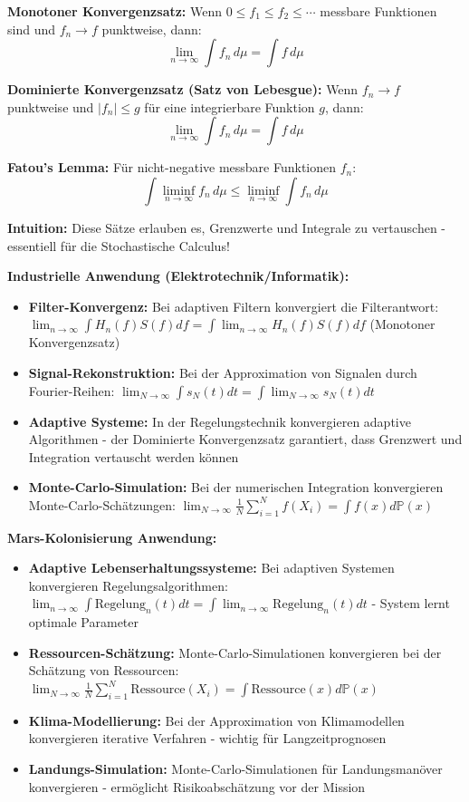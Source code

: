 \begin{denoobification}
\textbf{Monotoner Konvergenzsatz:}
Wenn $0 \leq f_1 \leq f_2 \leq \cdots$ messbare Funktionen sind und $f_n \to f$ punktweise, dann:
\[
\lim_{n \to \infty} \int f_n \, d\mu = \int f \, d\mu
\]

\textbf{Dominierte Konvergenzsatz (Satz von Lebesgue):}
Wenn $f_n \to f$ punktweise und $|f_n| \leq g$ für eine integrierbare Funktion $g$, dann:
\[
\lim_{n \to \infty} \int f_n \, d\mu = \int f \, d\mu
\]

\textbf{Fatou's Lemma:}
Für nicht-negative messbare Funktionen $f_n$:
\[
\int \liminf_{n \to \infty} f_n \, d\mu \leq \liminf_{n \to \infty} \int f_n \, d\mu
\]

\textbf{Intuition:} Diese Sätze erlauben es, Grenzwerte und Integrale zu vertauschen - essentiell für die Stochastische Calculus!

\textbf{Industrielle Anwendung (Elektrotechnik/Informatik):}
\begin{itemize}
    \item \textbf{Filter-Konvergenz:} Bei adaptiven Filtern konvergiert die Filterantwort: $\lim_{n \to \infty} \int H_n(f) S(f) df = \int \lim_{n \to \infty} H_n(f) S(f) df$ (Monotoner Konvergenzsatz)
    \item \textbf{Signal-Rekonstruktion:} Bei der Approximation von Signalen durch Fourier-Reihen: $\lim_{N \to \infty} \int s_N(t) dt = \int \lim_{N \to \infty} s_N(t) dt$
    \item \textbf{Adaptive Systeme:} In der Regelungstechnik konvergieren adaptive Algorithmen - der Dominierte Konvergenzsatz garantiert, dass Grenzwert und Integration vertauscht werden können
    \item \textbf{Monte-Carlo-Simulation:} Bei der numerischen Integration konvergieren Monte-Carlo-Schätzungen: $\lim_{N \to \infty} \frac{1}{N}\sum_{i=1}^N f(X_i) = \int f(x) d\mathbb{P}(x)$
\end{itemize}

\textbf{Mars-Kolonisierung Anwendung:}
\begin{itemize}
    \item \textbf{Adaptive Lebenserhaltungssysteme:} Bei adaptiven Systemen konvergieren Regelungsalgorithmen: $\lim_{n \to \infty} \int \text{Regelung}_n(t) dt = \int \lim_{n \to \infty} \text{Regelung}_n(t) dt$ - System lernt optimale Parameter
    \item \textbf{Ressourcen-Schätzung:} Monte-Carlo-Simulationen konvergieren bei der Schätzung von Ressourcen: $\lim_{N \to \infty} \frac{1}{N}\sum_{i=1}^N \text{Ressource}(X_i) = \int \text{Ressource}(x) d\mathbb{P}(x)$
    \item \textbf{Klima-Modellierung:} Bei der Approximation von Klimamodellen konvergieren iterative Verfahren - wichtig für Langzeitprognosen
    \item \textbf{Landungs-Simulation:} Monte-Carlo-Simulationen für Landungsmanöver konvergieren - ermöglicht Risikoabschätzung vor der Mission
\end{itemize}


\end{denoobification}
